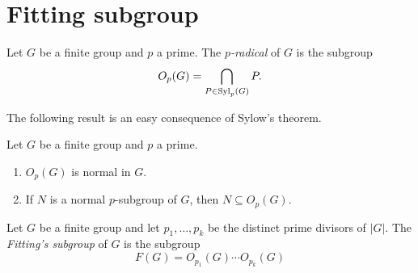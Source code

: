 

\section*{Fitting subgroup}

\begin{definition}
	Let $G$ be a finite group and $p$ a prime. The
	{\em $p$-radical} of $G$ is the subgroup
	\[
		O_p(G)=\bigcap_{P\in\mathrm{Syl}_p(G)}P.
	\]
\end{definition}

The following result is an easy consequence of Sylow's theorem.  
\begin{lemma}
	\label{lemma:core:Op(G)}
	Let $G$ be a finite group and $p$ a prime. 
	\begin{enumerate}
		\item $O_p(G)$ is normal in $G$.
		\item If $N$ is a normal $p$-subgroup of $G$, then $N\subseteq O_p(G)$.
	\end{enumerate}
\end{lemma}

%

\begin{definition}
	Let $G$ be a finite group and let $p_1,\dots,p_k$ be the distinct prime divisors of	$|G|$.  
	The {\em Fitting's subgroup} of $G$ is the subgroup
	\[
		F(G)=O_{p_1}(G)\cdots O_{p_k}(G)
	\]
\end{definition}

